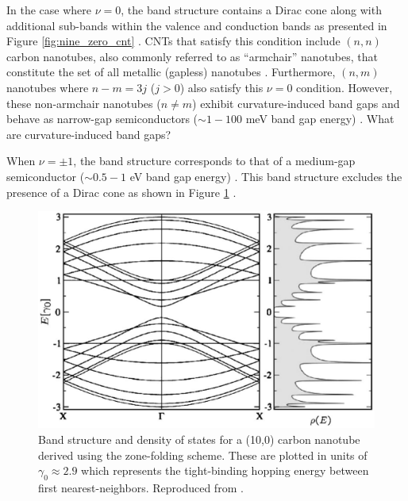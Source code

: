 %
In the case where $\nu = 0 $, the band structure contains a Dirac cone along with additional sub-bands within the valence and conduction bands as presented in Figure \ref{fig:nine_zero_cnt} . CNTs that satisfy this condition include $(n,n)$ carbon nanotubes, also commonly referred to as ``armchair'' nanotubes, that constitute the set of all metallic (gapless) nanotubes \cite{nanot2012optoelectronic}. Furthermore, $(n,m)$ nanotubes where $n-m = 3j$ ($j > 0$) also satisfy this $\nu = 0$ condition. However, these non-armchair nanotubes ($n\neq m$) exhibit curvature-induced band gaps and behave as narrow-gap semiconductors ($\sim1 - 100$ meV band gap energy) \cite{nanot2012optoelectronic}. {\color{red} What are curvature-induced band gaps?}

When $\nu= \pm 1$, the band structure corresponds to that of a medium-gap semiconductor ($\sim0.5 - 1$ eV band gap energy) \cite{nanot2012optoelectronic}. This band structure excludes the presence of a Dirac cone as shown in Figure \ref{fig:ten_zero_cnt}  \cite{charlier2007electronic}.
 


\begin{figure}[h]
	\centering
	\includegraphics[scale=0.38]{images/chapter_optical_props/ten_zero_band_charlier}
	\caption{Band structure and density of states for a (10,0) carbon nanotube derived using the zone-folding scheme. These are plotted in units of $\gamma_0 \approx 2.9$ which represents the tight-binding hopping energy between first nearest-neighbors. Reproduced from \cite{charlier2007electronic}.}
	\label{fig:ten_zero_cnt}
\end{figure}


